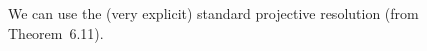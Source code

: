 \section{}





\subsection{}

We can use the (very explicit) standard projective resolution (from Theorem~6.11).





\subsection{}

